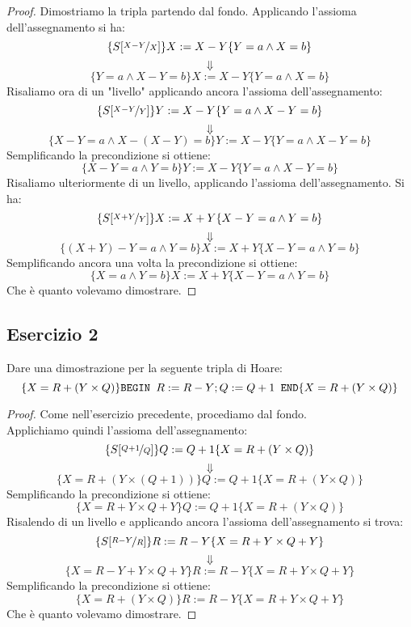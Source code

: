 \begin{proof}
Dimostriamo la tripla partendo dal fondo. Applicando l'assioma dell'assegnamento si ha:
\[ \{S[\nicefrac{X-Y}{X}] \}  X:=X-Y  \{Y=a  \land  X=b\} \]
\[ \Downarrow \]
\[ \{Y=a  \land X-Y=b \}  X:=X-Y  \{Y=a  \land  X=b\} \]
Risaliamo ora di un "livello" applicando ancora l'assioma dell'assegnamento:
\[ \{S[\nicefrac{X-Y}{Y}] \}  Y:=X-Y  \{Y=a  \land  X-Y=b\} \]
\[ \Downarrow \]
\[ \{X-Y=a  \land X-(X-Y)=b \}  Y:=X-Y  \{Y=a  \land  X-Y=b\} \]
Semplificando la precondizione si ottiene:
\[ \{X-Y=a  \land Y=b \}  Y:=X-Y  \{Y=a  \land  X-Y=b\} \]
Risaliamo ulteriormente di un livello, applicando l'assioma dell'assegnamento. Si ha:
\[ \{S[\nicefrac{X+Y}{Y}] \}  X:=X+Y  \{X-Y=a  \land  Y=b\} \]
\[ \Downarrow \]
\[ \{(X+Y)-Y=a  \land Y=b \}  X:=X+Y  \{X-Y=a  \land  Y=b\} \]
Semplificando ancora una volta la precondizione si ottiene:
\[ \{X=a  \land Y=b \}  X:=X+Y  \{X-Y=a  \land  Y=b\} \]
Che è quanto volevamo dimostrare.
\end{proof}

\subsection{Esercizio 2}
Dare una dimostrazione per la seguente tripla di Hoare:
\[ 
  \{X=R+(Y \times Q) \} \text{\texttt{BEGIN }} R:=R-Y; Q:=Q+1
  \text{\texttt{ END}} \{X=R+(Y \times Q)\} 
\]

\begin{proof}
Come nell'esercizio precedente, procediamo dal fondo.\\
Applichiamo quindi l'assioma dell'assegnamento:
\[ \{S[\nicefrac{Q+1}{Q}] \} Q:=Q+1 \{X=R+(Y \times Q)\} \]
\[ \Downarrow \]
\[ \{X=R+(Y \times (Q+1)) \} Q:=Q+1 \{X=R+(Y \times Q)\} \]
Semplificando la precondizione si ottiene:
\[ \{X=R+Y \times Q + Y \} Q:=Q+1 \{X=R+(Y \times Q)\} \]
Risalendo di un livello e applicando ancora l'assioma dell'assegnamento si trova:
\[ \{S[\nicefrac{R-Y}{R}] \} R:=R-Y \{X=R+Y \times Q + Y \} \]
\[ \Downarrow \]
\[ \{X= R-Y+Y \times Q+Y \} R:=R-Y \{X=R+Y \times Q + Y \} \]
Semplificando la precondizione si ottiene:
\[ \{X= R+(Y \times Q) \} R:=R-Y \{X=R+Y \times Q + Y \} \]
Che è quanto volevamo dimostrare.
\end{proof}

